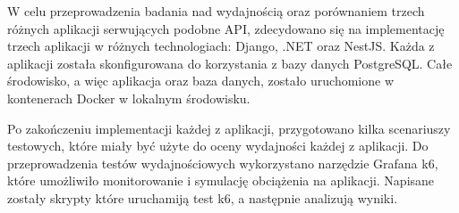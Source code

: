 W celu przeprowadzenia badania nad wydajnością oraz porównaniem trzech różnych aplikacji serwujących podobne API, zdecydowano się na implementację trzech aplikacji w różnych technologiach: Django, .NET oraz NestJS.
Każda z aplikacji została skonfigurowana do korzystania z bazy danych PostgreSQL.
Całe środowisko, a więc aplikacja oraz baza danych, zostało uruchomione w kontenerach Docker w lokalnym środowisku.

Po zakończeniu implementacji każdej z aplikacji, przygotowano kilka scenariuszy testowych, które miały być użyte do oceny wydajności każdej z aplikacji.
Do przeprowadzenia testów wydajnościowych wykorzystano narzędzie Grafana k6, które umożliwiło monitorowanie i symulację obciążenia na aplikacji.
Napisane zostały skrypty które uruchamiją test k6, a następnie analizują wyniki.